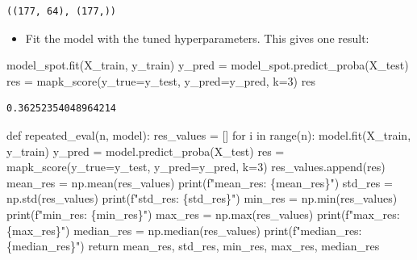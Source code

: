 \documentclass[
  letterpaper,
  DIV=11,
  numbers=noendperiod]{scrreprt}
\newenvironment{Shaded}{\begin{snugshade}}{\end{snugshade}}
\newcommand{\BuiltInTok}[1]{\textcolor[rgb]{0.00,0.23,0.31}{#1}}
\newcommand{\ControlFlowTok}[1]{\textcolor[rgb]{0.00,0.23,0.31}{#1}}
\newcommand{\DecValTok}[1]{\textcolor[rgb]{0.68,0.00,0.00}{#1}}
\newcommand{\KeywordTok}[1]{\textcolor[rgb]{0.00,0.23,0.31}{#1}}
\newcommand{\NormalTok}[1]{\textcolor[rgb]{0.00,0.23,0.31}{#1}}
\newcommand{\OperatorTok}[1]{\textcolor[rgb]{0.37,0.37,0.37}{#1}}
\newcommand{\SpecialCharTok}[1]{\textcolor[rgb]{0.37,0.37,0.37}{#1}}
\newcommand{\SpecialStringTok}[1]{\textcolor[rgb]{0.13,0.47,0.30}{#1}}
\providecommand{\tightlist}{%
  \setlength{\itemsep}{0pt}\setlength{\parskip}{0pt}}\usepackage{longtable,booktabs,array}
\begin{document}
\begin{verbatim}
((177, 64), (177,))
\end{verbatim}

\begin{itemize}
\tightlist
\item
  Fit the model with the tuned hyperparameters. This gives one result:
\end{itemize}

\begin{Shaded}
\begin{Highlighting}[]
\NormalTok{model\_spot.fit(X\_train, y\_train)}
\NormalTok{y\_pred }\OperatorTok{=}\NormalTok{ model\_spot.predict\_proba(X\_test)}
\NormalTok{res }\OperatorTok{=}\NormalTok{ mapk\_score(y\_true}\OperatorTok{=}\NormalTok{y\_test, y\_pred}\OperatorTok{=}\NormalTok{y\_pred, k}\OperatorTok{=}\DecValTok{3}\NormalTok{)}
\NormalTok{res}
\end{Highlighting}
\end{Shaded}

\begin{verbatim}
0.36252354048964214
\end{verbatim}

\begin{Shaded}
\begin{Highlighting}[]
\KeywordTok{def}\NormalTok{ repeated\_eval(n, model):}
\NormalTok{    res\_values }\OperatorTok{=}\NormalTok{ []}
    \ControlFlowTok{for}\NormalTok{ i }\KeywordTok{in} \BuiltInTok{range}\NormalTok{(n):}
\NormalTok{        model.fit(X\_train, y\_train)}
\NormalTok{        y\_pred }\OperatorTok{=}\NormalTok{ model.predict\_proba(X\_test)}
\NormalTok{        res }\OperatorTok{=}\NormalTok{ mapk\_score(y\_true}\OperatorTok{=}\NormalTok{y\_test, y\_pred}\OperatorTok{=}\NormalTok{y\_pred, k}\OperatorTok{=}\DecValTok{3}\NormalTok{)}
\NormalTok{        res\_values.append(res)}
\NormalTok{    mean\_res }\OperatorTok{=}\NormalTok{ np.mean(res\_values)}
    \BuiltInTok{print}\NormalTok{(}\SpecialStringTok{f"mean\_res: }\SpecialCharTok{\{}\NormalTok{mean\_res}\SpecialCharTok{\}}\SpecialStringTok{"}\NormalTok{)}
\NormalTok{    std\_res }\OperatorTok{=}\NormalTok{ np.std(res\_values)}
    \BuiltInTok{print}\NormalTok{(}\SpecialStringTok{f"std\_res: }\SpecialCharTok{\{}\NormalTok{std\_res}\SpecialCharTok{\}}\SpecialStringTok{"}\NormalTok{)}
\NormalTok{    min\_res }\OperatorTok{=}\NormalTok{ np.}\BuiltInTok{min}\NormalTok{(res\_values)}
    \BuiltInTok{print}\NormalTok{(}\SpecialStringTok{f"min\_res: }\SpecialCharTok{\{}\NormalTok{min\_res}\SpecialCharTok{\}}\SpecialStringTok{"}\NormalTok{)}
\NormalTok{    max\_res }\OperatorTok{=}\NormalTok{ np.}\BuiltInTok{max}\NormalTok{(res\_values)}
    \BuiltInTok{print}\NormalTok{(}\SpecialStringTok{f"max\_res: }\SpecialCharTok{\{}\NormalTok{max\_res}\SpecialCharTok{\}}\SpecialStringTok{"}\NormalTok{)}
\NormalTok{    median\_res }\OperatorTok{=}\NormalTok{ np.median(res\_values)}
    \BuiltInTok{print}\NormalTok{(}\SpecialStringTok{f"median\_res: }\SpecialCharTok{\{}\NormalTok{median\_res}\SpecialCharTok{\}}\SpecialStringTok{"}\NormalTok{)}
    \ControlFlowTok{return}\NormalTok{ mean\_res, std\_res, min\_res, max\_res, median\_res}
\end{Highlighting}
\end{Shaded}
\end{document}
